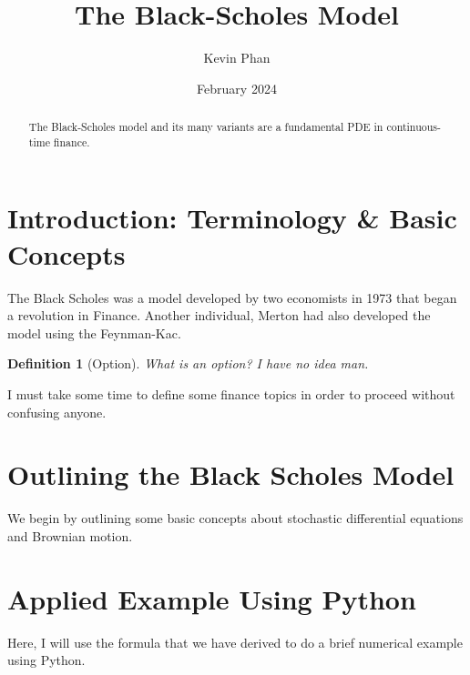 \documentclass{article}
\title{The Black-Scholes Model}
\author{Kevin Phan}
\date{February 2024}
\newtheorem{definition}{Definition}[section]
\begin{document}
\maketitle

\begin{abstract}
    The Black-Scholes model and its many variants are a fundamental PDE in continuous-time finance. 
\end{abstract}

\section{Introduction: Terminology \& Basic Concepts}

The Black Scholes was a model developed by two economists in 1973 that began a revolution in Finance.
Another individual, Merton had also developed the model using the Feynman-Kac. 
 
\begin{definition}[Option]
What is an option? I have no idea man.
\end{definition}

I must take some time to define some finance topics in order to proceed without confusing anyone.



\section{Outlining the Black Scholes Model}
We begin by outlining some basic concepts about stochastic differential equations and Brownian motion. 

\section{Applied Example Using Python}

Here, I will use the formula that we have derived to do a brief numerical example using Python.
\end{document}
